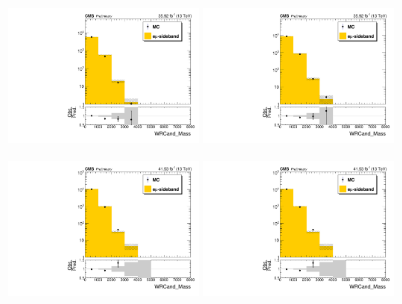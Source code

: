 \begin{figure}[htbp]
  \centering

  \includegraphics[width=0.45\textwidth]{figures/2016/Resolved_WRCand_Mass_HNWR_SingleElectron_Resolved_SR_TTLX_powheg.pdf}
  \hspace{0.01\textwidth}
  \includegraphics[width=0.45\textwidth]{figures/2016/Resolved_WRCand_Mass_HNWR_SingleMuon_Resolved_SR_TTLX_powheg.pdf}
  \vspace{0.01\textwidth}

  \includegraphics[width=0.45\textwidth]{figures/2017/Resolved_WRCand_Mass_HNWR_SingleMuon_Resolved_SR_TTLX_powheg.pdf}
  \hspace{0.01\textwidth}
  \includegraphics[width=0.45\textwidth]{figures/2017/Resolved_WRCand_Mass_HNWR_SingleMuon_Resolved_SR_TTLX_powheg.pdf}
  

\end{figure}
